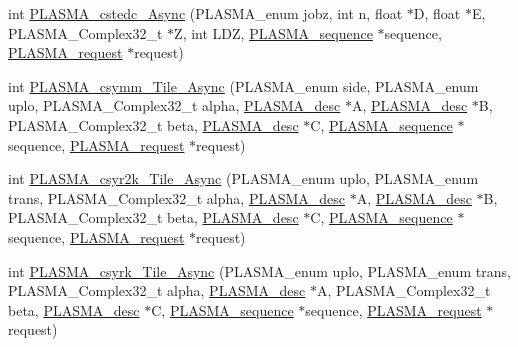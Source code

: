 \begin{DoxyCompactItemize}
\item 
int \hyperlink{group__PLASMA__Complex32__t__Tile__Async_gaf29ed19732bad7dcfc00884a43de274c_gaf29ed19732bad7dcfc00884a43de274c}{P\+L\+A\+S\+M\+A\+\_\+cstedc\+\_\+\+Async} (P\+L\+A\+S\+M\+A\+\_\+enum jobz, int n, float $\ast$D, float $\ast$E, P\+L\+A\+S\+M\+A\+\_\+\+Complex32\+\_\+t $\ast$Z, int L\+D\+Z, \hyperlink{structplasma__sequence__t}{P\+L\+A\+S\+M\+A\+\_\+sequence} $\ast$sequence, \hyperlink{structplasma__request__t}{P\+L\+A\+S\+M\+A\+\_\+request} $\ast$request)
\item 
int \hyperlink{group__PLASMA__Complex32__t__Tile__Async_ga26b32f3f12ccafae49042cfd704684ab_ga26b32f3f12ccafae49042cfd704684ab}{P\+L\+A\+S\+M\+A\+\_\+csymm\+\_\+\+Tile\+\_\+\+Async} (P\+L\+A\+S\+M\+A\+\_\+enum side, P\+L\+A\+S\+M\+A\+\_\+enum uplo, P\+L\+A\+S\+M\+A\+\_\+\+Complex32\+\_\+t alpha, \hyperlink{structplasma__desc__t}{P\+L\+A\+S\+M\+A\+\_\+desc} $\ast$A, \hyperlink{structplasma__desc__t}{P\+L\+A\+S\+M\+A\+\_\+desc} $\ast$B, P\+L\+A\+S\+M\+A\+\_\+\+Complex32\+\_\+t beta, \hyperlink{structplasma__desc__t}{P\+L\+A\+S\+M\+A\+\_\+desc} $\ast$C, \hyperlink{structplasma__sequence__t}{P\+L\+A\+S\+M\+A\+\_\+sequence} $\ast$sequence, \hyperlink{structplasma__request__t}{P\+L\+A\+S\+M\+A\+\_\+request} $\ast$request)
\item 
int \hyperlink{group__PLASMA__Complex32__t__Tile__Async_ga7a0777c74ef118b8060a680bb639a97b_ga7a0777c74ef118b8060a680bb639a97b}{P\+L\+A\+S\+M\+A\+\_\+csyr2k\+\_\+\+Tile\+\_\+\+Async} (P\+L\+A\+S\+M\+A\+\_\+enum uplo, P\+L\+A\+S\+M\+A\+\_\+enum trans, P\+L\+A\+S\+M\+A\+\_\+\+Complex32\+\_\+t alpha, \hyperlink{structplasma__desc__t}{P\+L\+A\+S\+M\+A\+\_\+desc} $\ast$A, \hyperlink{structplasma__desc__t}{P\+L\+A\+S\+M\+A\+\_\+desc} $\ast$B, P\+L\+A\+S\+M\+A\+\_\+\+Complex32\+\_\+t beta, \hyperlink{structplasma__desc__t}{P\+L\+A\+S\+M\+A\+\_\+desc} $\ast$C, \hyperlink{structplasma__sequence__t}{P\+L\+A\+S\+M\+A\+\_\+sequence} $\ast$sequence, \hyperlink{structplasma__request__t}{P\+L\+A\+S\+M\+A\+\_\+request} $\ast$request)
\item 
int \hyperlink{group__PLASMA__Complex32__t__Tile__Async_ga3c1cefe5f4b6c9899da477fc46284972_ga3c1cefe5f4b6c9899da477fc46284972}{P\+L\+A\+S\+M\+A\+\_\+csyrk\+\_\+\+Tile\+\_\+\+Async} (P\+L\+A\+S\+M\+A\+\_\+enum uplo, P\+L\+A\+S\+M\+A\+\_\+enum trans, P\+L\+A\+S\+M\+A\+\_\+\+Complex32\+\_\+t alpha, \hyperlink{structplasma__desc__t}{P\+L\+A\+S\+M\+A\+\_\+desc} $\ast$A, P\+L\+A\+S\+M\+A\+\_\+\+Complex32\+\_\+t beta, \hyperlink{structplasma__desc__t}{P\+L\+A\+S\+M\+A\+\_\+desc} $\ast$C, \hyperlink{structplasma__sequence__t}{P\+L\+A\+S\+M\+A\+\_\+sequence} $\ast$sequence, \hyperlink{structplasma__request__t}{P\+L\+A\+S\+M\+A\+\_\+request} $\ast$request)

\end{DoxyCompactItemize}
